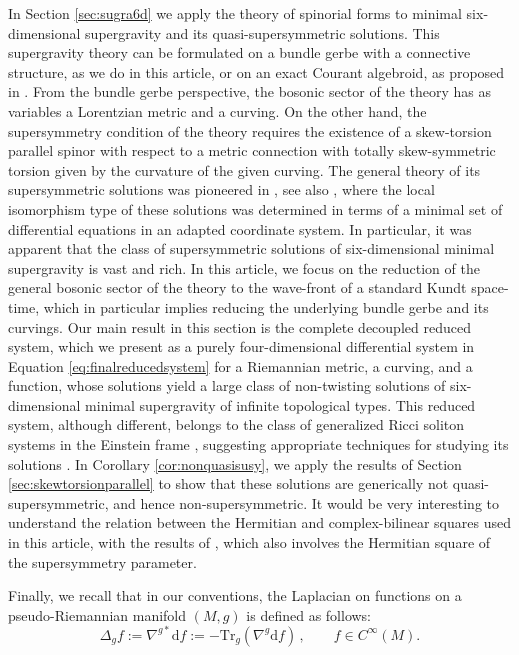 \documentclass[10pt,a4paper,twoside,reqno]{amsart}
\theoremstyle{plain}
\theoremstyle{definition}
\theoremstyle{remark}
\def\dd{\mathrm{d}}
\newcommand{\Tr}{\mathrm{Tr}}
\def\dd{\mathrm{d}}
\begin{document}
In Section \ref{sec:sugra6d} we apply the theory of spinorial forms to minimal six-dimensional supergravity and its quasi-supersymmetric solutions. This supergravity theory can be formulated on a bundle gerbe with a connective structure, as we do in this article, or on an exact Courant algebroid, as proposed in \cite{Garcia-Fernandez:2015lsa,MarioStreets}. From the bundle gerbe perspective, the bosonic sector of the theory has as variables a Lorentzian metric and a curving. On the other hand, the supersymmetry condition of the theory requires the existence of a skew-torsion parallel spinor with respect to a metric connection with totally skew-symmetric torsion given by the curvature of the given curving. The general theory of its supersymmetric solutions was pioneered in \cite{Gutowski:2003rg}, see also \cite{Chamseddine:2003yy}, where the local isomorphism type of these solutions was determined in terms of a minimal set of differential equations in an adapted coordinate system. In particular, it was apparent that the class of supersymmetric solutions of six-dimensional minimal supergravity is vast and rich. In this article, we focus on the reduction of the general bosonic sector of the theory to the wave-front of a standard Kundt space-time, which in particular implies reducing the underlying bundle gerbe and its curvings. Our main result in this section is the complete decoupled reduced system, which we present as a purely four-dimensional differential system in Equation \eqref{eq:finalreducedsystem} for a Riemannian metric, a curving, and a function, whose solutions yield a large class of non-twisting solutions of six-dimensional minimal supergravity of infinite topological types. This reduced system, although different, belongs to the class of generalized Ricci soliton systems \cite{MarioStreets} in the Einstein frame \cite[Lemma 2.24]{Bunk:2025glt}, suggesting appropriate techniques for studying its solutions \cite{StreetsI,StreetsUstinovskiy,StreetsUstinovskiyII}. In Corollary \ref{cor:nonquasisusy}, we apply the results of Section \ref{sec:skewtorsionparallel} to show that these solutions are generically not quasi-supersymmetric, and hence non-supersymmetric. It would be very interesting to understand the relation between the Hermitian and complex-bilinear squares used in this article, with the results of \cite{Figueroa_Lorentzian_6d_2018}, which also involves the Hermitian square of the supersymmetry parameter.\medskip

Finally, we recall that in our conventions, the Laplacian on functions on a pseudo-Riemannian manifold $(M,g)$ is defined as follows: \begin{equation*}
\Delta_g f := \nabla^{g*}\dd f := -\Tr_g(\nabla^g\dd f) \, , \qquad f\in C^{\infty}(M).
\end{equation*}
\end{document}
